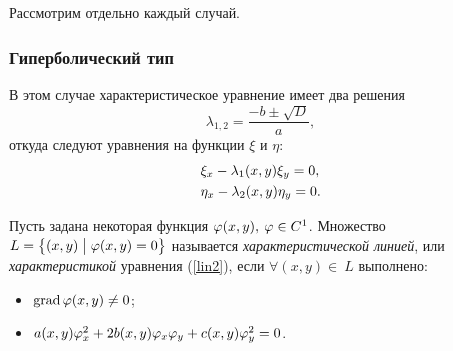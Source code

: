     Рассмотрим отдельно каждый случай.

    \subsubsection{Гиперболический тип} В этом случае характеристическое уравнение имеет два решения
    \begin{equation*}
        \lambda_{1,2} = \frac{-b \pm \sqrt{D}}{a},
    \end{equation*}
    откуда следуют уравнения на функции $\xi$ и $\eta$:
    \begin{align}
        & \xi_x - \lambda_1(x, y) \xi_y = 0,\notag \\ \label{char_eq_lin2}
        & \eta_x - \lambda_2(x, y) \eta_y = 0.
    \end{align}
    \begin{Def}
        Пусть задана некоторая функция $\varphi(x, y),\: \varphi \in C^1$. Множество $L = \left\{{(x, y) \bigm| \varphi(x, y) = 0}\right\}$ называется 
        \textit{характеристической линией}, или \textit{характеристикой} уравнения (\ref{lin2}), если $\forall (x, y)\in~L$ выполнено:
        \begin{itemize}
            \item $\operatorname{grad} \varphi(x, y) \not= 0$;
            \item $a(x,y)\varphi_x^2 + 2b(x,y)\varphi_x\varphi_y + c(x,y)\varphi_y^2 = 0$.
        \end{itemize}
    \end{Def}

